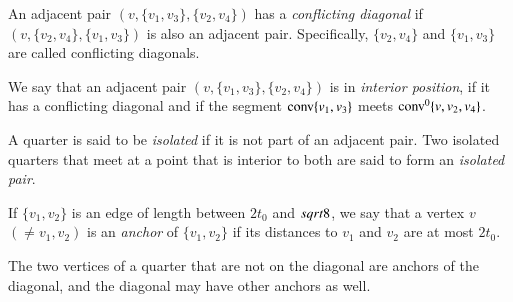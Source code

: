 \begin{definition}\label{def:conflicting-diag} An adjacent pair
$(v,\{v_1,v_3\},\{v_2,v_4\})$ has a {\it conflicting
diagonal} if
$(v,\{v_2,v_4\},\{v_1,v_3\})$ is also an adjacent pair.
Specifically, $\{v_2,v_4\}$ and $\{v_1,v_3\}$ are called
conflicting diagonals.
\end{definition}

\begin{definition}\label{def:interior-position}  We say
that an adjacent pair $(v,\{v_1,v_3\},\{v_2,v_4\})$ is in {\it
interior position}, if it has a conflicting diagonal and if the
segment ${\operatorname{conv}}\{v_1,v_3\}$ meets
${\operatorname{conv}}^0\{v,v_2,v_4\}$. 
\end{definition}

\begin{definition}
A quarter is said to be {\it isolated} if it is
not part of an adjacent pair.  Two isolated quarters that meet at
a point that is interior to both are said to form an {\it isolated
pair}.
%
\end{definition}


\begin{definition}[anchor] \label{def:anchor}
If $\{v_1,v_2\}$ is an edge of length between $2t_0$ and $sqrt8$,
we say that a vertex $v$ $(\ne v_1,v_2)$ is an {\it {}
anchor\/} of $\{v_1,v_2\}$ if its distances to $v_1$ and $v_2$ are
at most $2t_0$.
%
\end{definition}

The two vertices of a quarter that are not on the diagonal are
anchors of the diagonal, and the diagonal may have other anchors
as well.

